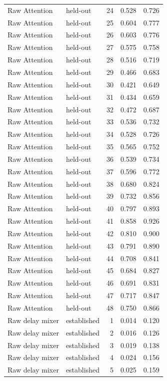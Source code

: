 \begin{tabular}{llrrr}
Raw Attention & held-out & 24 & 0.528 & 0.726 \\
Raw Attention & held-out & 25 & 0.604 & 0.777 \\
Raw Attention & held-out & 26 & 0.603 & 0.776 \\
Raw Attention & held-out & 27 & 0.575 & 0.758 \\
Raw Attention & held-out & 28 & 0.516 & 0.719 \\
Raw Attention & held-out & 29 & 0.466 & 0.683 \\
Raw Attention & held-out & 30 & 0.421 & 0.649 \\
Raw Attention & held-out & 31 & 0.434 & 0.659 \\
Raw Attention & held-out & 32 & 0.472 & 0.687 \\
Raw Attention & held-out & 33 & 0.536 & 0.732 \\
Raw Attention & held-out & 34 & 0.528 & 0.726 \\
Raw Attention & held-out & 35 & 0.565 & 0.752 \\
Raw Attention & held-out & 36 & 0.539 & 0.734 \\
Raw Attention & held-out & 37 & 0.596 & 0.772 \\
Raw Attention & held-out & 38 & 0.680 & 0.824 \\
Raw Attention & held-out & 39 & 0.732 & 0.856 \\
Raw Attention & held-out & 40 & 0.797 & 0.893 \\
Raw Attention & held-out & 41 & 0.858 & 0.926 \\
Raw Attention & held-out & 42 & 0.810 & 0.900 \\
Raw Attention & held-out & 43 & 0.791 & 0.890 \\
Raw Attention & held-out & 44 & 0.708 & 0.841 \\
Raw Attention & held-out & 45 & 0.684 & 0.827 \\
Raw Attention & held-out & 46 & 0.691 & 0.831 \\
Raw Attention & held-out & 47 & 0.717 & 0.847 \\
Raw Attention & held-out & 48 & 0.750 & 0.866 \\
Raw delay mixer & established & 1 & 0.014 & 0.120 \\
Raw delay mixer & established & 2 & 0.016 & 0.126 \\
Raw delay mixer & established & 3 & 0.019 & 0.138 \\
Raw delay mixer & established & 4 & 0.024 & 0.156 \\
Raw delay mixer & established & 5 & 0.025 & 0.159 \\

\end{tabular}
